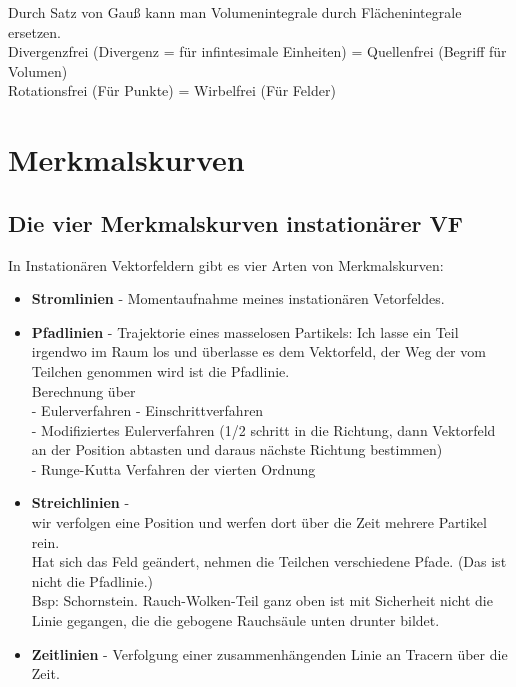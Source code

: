 \documentclass{article}
\begin{document}
\noindent Durch Satz von Gauß kann man Volumenintegrale durch Flächenintegrale ersetzen.\\

\noindent Divergenzfrei (Divergenz = für infintesimale Einheiten) = Quellenfrei (Begriff für Volumen)\\
\noindent Rotationsfrei (Für Punkte) = Wirbelfrei (Für Felder) \\




\pagebreak
\section{Merkmalskurven}
\subsection{Die vier Merkmalskurven instationärer VF}
In Instationären Vektorfeldern gibt es vier Arten von Merkmalskurven:

\begin{itemize}[noitemsep]
	\item \textbf{Stromlinien} - Momentaufnahme meines instationären Vetorfeldes.\\
	\item \textbf{Pfadlinien} -  Trajektorie eines masselosen Partikels: Ich lasse ein Teil irgendwo im Raum los und überlasse es dem Vektorfeld, der Weg der vom Teilchen genommen wird ist die Pfadlinie.\\
	Berechnung über\\
	- Eulerverfahren - Einschrittverfahren\\
	- Modifiziertes Eulerverfahren (1/2 schritt in die Richtung, dann Vektorfeld an der Position abtasten und daraus nächste Richtung bestimmen)\\
	- Runge-Kutta Verfahren der vierten Ordnung\\
	\item \textbf{Streichlinien} - \\
	wir verfolgen eine Position und werfen dort über die Zeit mehrere Partikel rein.\\
	Hat sich das Feld geändert, nehmen die Teilchen verschiedene Pfade.	(Das ist nicht die Pfadlinie.)\\
	Bsp: Schornstein. Rauch-Wolken-Teil ganz oben ist mit Sicherheit nicht die Linie gegangen, die die gebogene Rauchsäule unten drunter bildet.\\
	
	\item \textbf{Zeitlinien} - Verfolgung einer zusammenhängenden Linie an Tracern über die Zeit.
\end{itemize}
\end{document}
